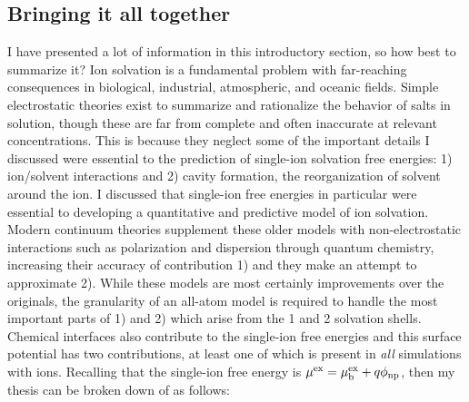 \begin{intro}
  \section{\label{ch1:sec6:level1}Bringing it all together}
   I have presented a lot of information in this introductory section, so how best to summarize it? Ion solvation is a fundamental problem with far-reaching consequences
   in biological, industrial, atmospheric, and oceanic fields. Simple electrostatic theories exist to summarize and rationalize the behavior of salts in solution, though
   these are far from complete and often inaccurate at relevant concentrations. This is because they neglect some of the important details I discussed were essential to the
   prediction of single-ion solvation free energies: 1) ion/solvent interactions and 2) cavity formation, the reorganization of solvent around the ion. I discussed that 
   single-ion free energies in particular were essential to developing a quantitative and predictive model of ion solvation. Modern continuum theories supplement these 
   older models with non-electrostatic interactions such as polarization and dispersion through quantum chemistry, increasing their accuracy of contribution 1) and they make 
   an attempt to approximate 2). While these models are most certainly improvements over the originals, the granularity of an all-atom model is required to handle the most
   important parts of 1) and 2) which arise from the 1 and 2 solvation shells. Chemical interfaces also contribute to the single-ion free energies and this
   surface potential has two contributions, at least one of which is present in \emph{all} simulations with ions. Recalling that the single-ion free energy is $\mu^{\mathrm{ex}} 
   = \mu^{\mathrm{ex}}_{\mathrm{b}} + q\phi_{\mathrm{np}}$, then my thesis can be broken down of as follows:
   

\end{intro}
